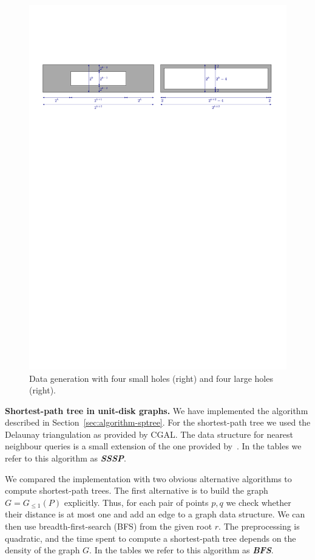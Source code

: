 \documentclass[a4paper,USenglish]{lipics}
\newcommand{\GG}{\ensuremath{G_{\le 1}}}
\def\DEF#1{\textbf{\emph{#1}}}
\let\le\leqslant
\def\myparagraph#1{\medskip\noindent\textbf{#1.}}
\begin{document}
\begin{figure}
	\includegraphics[width=\textwidth,page=2]{data_generation}
	\caption{Data generation with four small holes (right) and four large holes (right).}
	\label{fig:data_generation2}
\end{figure}


\myparagraph{Shortest-path tree in unit-disk graphs}
We have implemented the algorithm described in Section~\ref{sec:algorithm-sptree}.
For the shortest-path tree we used the Delaunay triangulation as provided by CGAL.
The data structure for nearest neighbour queries is a small extension of
the one provided by~\cite{cgal:k-vda2-15a}. 
In the tables we refer to this algorithm as \DEF{SSSP}.

We compared the implementation with two obvious alternative algorithms to
compute shortest-path trees.
The first alternative is to build the graph $G=\GG(P)$ explicitly. 
Thus, for each pair of points $p,q$ we check whether their distance is
at most one and add an edge to a graph data structure.
We can then use breadth-first-search (BFS) from the given root $r$.
The preprocessing is quadratic, and the time spent to compute
a shortest-path tree depends on the density of the graph $G$.
In the tables we refer to this algorithm as \DEF{BFS}.
\end{document}
